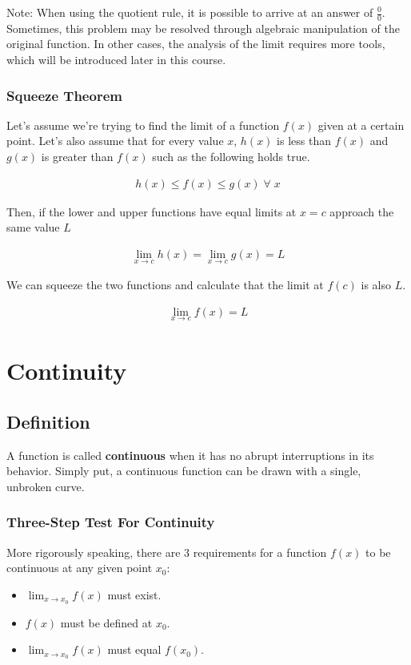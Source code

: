 \documentclass[11pt]{article}
\begin{document}
Note: When using the quotient rule, it is possible to arrive at an answer of $\frac{0}{0}$. Sometimes, this problem may be resolved through algebraic manipulation of the original function. In other cases, the analysis of the limit requires more tools, which will be introduced later in this course.

\subsubsection*{Squeeze Theorem}

Let's assume we're trying to find the limit of a function $f(x)$ given at a certain point. Let's also assume that for every value $x$, $h(x)$ is less than $f(x)$ and $g(x)$ is greater than $f(x)$ such as the following holds true.

\begin{align*}
    h(x) \leq f(x) \leq g(x)\;\forall\; x
\end{align*}

Then, if the lower and upper functions have equal limits at $x = c$ approach the same value $L$

\begin{align*}
    \lim_{x \to c} h(x) = \lim_{x \to c} g(x) = L
\end{align*}

We can squeeze the two functions and calculate that the limit at $f(c)$ is also $L$.

\begin{align*}
    \lim_{x \to c}f(x) = L
\end{align*}


\section{Continuity}

\subsection{Definition}

A function is called \textbf{continuous} when it has no abrupt interruptions in its behavior. Simply put, a continuous function can be drawn with a single, unbroken curve. 

\subsubsection*{Three-Step Test For Continuity}
More rigorously speaking, there are 3 requirements for a function $f(x)$ to be continuous at any given point $x_0$: 
\begin{itemize}
  \item $\lim_{x\to x_0} f(x)$ must exist.
  \item $f(x)$ must be defined at $x_0$.
  \item $\lim_{x\to x_0} f(x)$ must equal $f(x_0)$.
\end{itemize}
\end{document}
